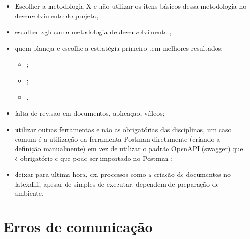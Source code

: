 \begin{itemize}
    \item Escolher a metodologia X e não utilizar os itens básicos dessa metodologia no desenvolvimento do projeto;
    
    \item escolher \ac{xgh} como metodologia de desenvolvimento \cite{xgh} \cite{xgh-axioms};
    
    \item quem planeja e escolhe a estratégia primeiro tem melhores resultados:
    \begin{itemize}
        \item 
        ;
        \item
        ;
    
        \item %
        .    
    \end{itemize}
    
    \item falta de revisão em documentos, aplicação, vídeos;
    
    \item utilizar outras ferramentas e não as obrigatórias das disciplinas, um caso comum é a utilização da ferramenta Postman diretamente (criando a definição manualmente) em vez de utilizar o padrão OpenAPI (swagger) que é obrigatório e que pode ser importado no Postman \cite{postman-openapi};
    
    \item deixar para ultima hora, ex. processos como a criação de documentos no latexdiff, apesar de simples de executar, dependem de preparação de ambiente.
\end{itemize}



\section{Erros de comunicação}


